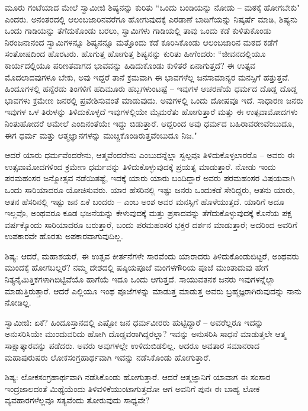 ಮೂರು ಗಂಟೆಯಾದ ಮೇಲೆ ಸ್ವಾಮೀಜಿ ಶಿಷ್ಯನನ್ನು ಕುರಿತು “ಒಂದು ಬಂಡಿಯನ್ನು ನೋಡು – ಮಠಕ್ಕೆ ಹೋಗಬೇಕು" ಎಂದರು. ಅನಂತರದಲ್ಲಿ ಆಲಂಬಜಾರಿನವರೆಗೂ ಹೋಗುವುದಕ್ಕೆ ಎರಡಾಣೆ ಬಾಡಿಗೆಯನ್ನು ನಿಷ್ಕರ್ಷೆ ಮಾಡಿ, ಶಿಷ್ಯನು ಒಂದು ಗಾಡಿಯನ್ನು ತೆಗೆದುಕೊಂಡು ಬರಲು, ಸ್ವಾಮಿಗಳು ಗಾಡಿಯಲ್ಲಿ ತಾವು ಒಂದು ಕಡೆ ಕುಳಿತುಕೊಂಡು ನಿರಂಜನಾನಂದ ಸ್ವಾಮಿಗಳನ್ನೂ ಶಿಷ್ಯನನ್ನೂ ಮತ್ತೊಂದು ಕಡೆ ಕೂರಿಸಿಕೊಂಡು ಆಲಂಬಜಾರಿನ ಮಠದ ಕಡೆಗೆ ಸಂತೋಷದಿಂದ ಹೊರಟರು. ಹೊಗುತ್ತ ಹೋಗುತ್ತ ಶಿಷ್ಯನನ್ನು ಕುರಿತು ಹೀಗೆಂದರು: “ಜೀವನದಲ್ಲಿಯೂ ಕಾರ್ಯದಲ್ಲಿಯೂ ಪರಿಣತವಾಗದ ಭಾವವನ್ನು ಹಿಡಿದುಕೊಂಡು ಕುಳಿತರೆ ಏನಾಗುತ್ತದೆ? ಈ ಉತ್ಸವ ಮೊದಲಾದವುಗಳೂ ಬೇಕು, ಅವು ಇದ್ದರೆ ತಾನೆ ಕ್ರಮವಾಗಿ ಈ ಭಾವಗಳೆಲ್ಲ ಜನಸಾಮಾನ್ಯರ ಮನಸ್ಸಿಗೆ ಹತ್ತುತ್ತವೆ. ಹಿಂದೂಗಳಲ್ಲಿ ಹನ್ನೆರಡು ತಿಂಗಳಿಗೆ ಹದಿಮೂರು ಹಬ್ಬಗಳುಂಟಷ್ಟೆ – ಇವುಗಳ ಆಚರಣೆಯೆ ಧರ್ಮದ ದೊಡ್ಡ ದೊಡ್ಡ ಭಾವಗಳು ಕ್ರಮೇಣ ಜನರಲ್ಲಿ ಪ್ರವೇಶಿಸುವಂತೆ ಮಾಡುವುದು. ಅವುಗಳಲ್ಲಿ ಒಂದು ದೋಷವೂ ಇದೆ. ಸಾಧಾರಣ ಜನರು ಇವುಗಳ ಒಳ ತಿರುಳನ್ನು ತಿಳಿದುಕೊಳ್ಳದೆ ಇವುಗಳಲ್ಲಿಯೇ ಮೈಮರೆತು ಹೋಗುತ್ತಾರೆ ಮತ್ತು ಈ ಉತ್ಸವಾಮೋದಗಳು ನಿಂತುಹೋದರೆ ಆಮೇಲೆ ಎಂದಿನಂತೆಯೇ ಇದ್ದು ಬಿಡುತ್ತಾರೆ. ಆದ್ದರಿಂದ ಅವು ಧರ್ಮದ ಬಹಿರಾವರಣವೆಂಬುದೂ, ಈಗ ಧರ್ಮ ಮತ್ತು ಆತ್ಮಜ್ಞಾನಗಳನ್ನು ಮುಚ್ಚಿಕೊಂಡಿರುತ್ತವೆಂಬುದೂ ನಿಜ."

ಆದರೆ ಯಾರು ಧರ್ಮವೆಂದರೇನು, ಆತ್ಮವೆಂದರೇನು ಎಂಬುದನ್ನೆಲ್ಲಾ ಸ್ವಲ್ಪವೂ ತಿಳಿದುಕೊಳ್ಳಲಾರರೊ – ಅವರು ಈ ಉತ್ಸವಾಮೋದಗಳಿಂದ ಕ್ರಮೇಣ ಧರ್ಮವನ್ನು ತಿಳಿದುಕೊಳ್ಳುವುದಕ್ಕೆ ಪ್ರಯತ್ನ ಮಾಡುತ್ತಾರೆ. ನೋಡು ಇಂದು ಪರಮಹಂಸರ ಜನ್ಮೋತ್ಸವ ನಡೆಯಿತಷ್ಟೆ, ಇದಕ್ಕೆ ಯಾರು ಯಾರು ಬಂದಿದ್ದಾರೆ ಅವರು ಪರಮಹಂಸರ ವಿಷಯವಾಗಿ ಒಂದು ಸಾರಿಯಾದರೂ ಯೋಚಿಸುವರು. ಯಾರ ಹೆಸರಿನಲ್ಲಿ ಇಷ್ಟು ಜನರು ಒಂದುಕಡೆ ಸೇರಿದ್ದರು, ಆತನು ಯಾರು, ಆತನ ಹೆಸರಿನಲ್ಲಿ ಇಷ್ಟು ಜನ ಏಕೆ ಬಂದರು – ಎಂಬ ಅಂಶ ಅವರ ಮನಸ್ಸಿಗೆ ಹೊಳೆಯುತ್ತದೆ. ಯಾರಿಗೆ ಅದೂ ಇಲ್ಲವೊ, ಅಂಥವರೂ ಕೂಡ ಭಜನೆಯನ್ನು ಕೇಳುವುದಕ್ಕೆ ಮತ್ತು ಪ್ರಸಾದವನ್ನು ತೆಗೆದುಕೊಳ್ಳುವುದಕ್ಕೆ ಕೊನೆಯ ಪಕ್ಷ ವರ್ಷಕ್ಕೊಂದು ಸಾರಿಯಾದರೂ ಬರುತ್ತಾರೆ, ಬಂದು ಪರಮಹಂಸರ ಭಕ್ತರ ದರ್ಶನ ಮಾಡುತ್ತಾರೆ; ಅದರಿಂದ ಅವರಿಗೆ ಉಪಕಾರವೇ ಹೊರತು ಅಪಕಾರವಾಗುವುದಿಲ್ಲ.

ಶಿಷ್ಯ: ಆದರೆ, ಮಹಾಶಯರೆ, ಈ ಉತ್ಸವ ಕೀರ್ತನೆಗಳೇ ಸಾರವೆಂದು ಯಾರಾದರು ತಿಳಿದುಕೊಂಡುಬಿಟ್ಟರೆ, ಅಂಥವರು ಮುಂದಕ್ಕೆ ಹೋಗಬಲ್ಲರೆ? ನಮ್ಮ ದೇಶದಲ್ಲಿ ಷಷ್ಠಿಯಪೂಜೆ ಮಂಗಳಗೌರಿಯ ಪೂಜೆ ಮುಂತಾದುವು ಹೇಗೆ ನಿತ್ಯನೈಮಿತ್ತಿಕಗಳಾಗಿಬಿಟ್ಟಿವೆಯೊ ಹಾಗೆಯೆ ಇದೂ ಒಂದು ಆಗುತ್ತದೆ. ಸಾಯುವತನಕ ಜನರು ಇವುಗಳನ್ನೆಲ್ಲಾ ಮಾಡುತ್ತಿರುತ್ತಾರೆ. ಆದರೆ ಎಲ್ಲಿಯೂ ಇಂಥ ಪೂಜೆಗಳನ್ನು ಮಾಡುತ್ತ ಮಾಡುತ್ತ ಅವರು ಬ್ರಹ್ಮಜ್ಞರಾಗಿರುವುದನ್ನು ನಾನು ನೋಡಿಲ್ಲ.

ಸ್ವಾಮೀಜಿ: ಏಕೆ? ಹಿಂದೂಸ್ತಾನದಲ್ಲಿ ಎಷ್ಟೋ ಜನ ಧರ್ಮವೀರರು ಹುಟ್ಟಿದ್ದಾರೆ – ಅವರೆಲ್ಲರೂ ಇದನ್ನು ಅನುಸರಿಸಿಯೇ ಮುಂದುವರಿದು ಹೋಗಿ ದೊಡ್ಡವರಾಗಿದ್ದರಲ್ಲಾ? ಇವನ್ನು ಅನುಸರಿಸಿ ಸಾಧನೆ ಮಾಡುತ್ತಲೇ ಆತ್ಮ ಸಾಕ್ಷಾತ್ಕಾರವನ್ನು ಪಡೆದರು. ಅವರು ಅವುಗಳಲ್ಲೇ ಉಳಿದುಬಿಡಲಿಲ್ಲ. ಆದರೂ ಅವತಾರ ಸಮಾನರಾದ ಮಹಾಪುರುಷರು ಲೋಕಸಂಗ್ರಹಾರ್ಥವಾಗಿ ಇವನ್ನು ನಡೆಸಿಕೊಂಡು ಹೋಗುತ್ತಾರೆ.

ಶಿಷ್ಯ: ಲೋಕಸಂಗ್ರಹಾರ್ಥವಾಗಿ ನಡೆಸಿಕೊಂಡು ಹೋಗುತ್ತಾರೆ. ಆದರೆ ಆತ್ಮಜ್ಞಾನಿಗೆ ಯಾವಾಗ ಈ ಸಂಸಾರ ಇಂದ್ರಜಾಲದಂತೆ ಮಿಥ್ಯೆಯೆಂದು ತಿಳಿವಳಿಕೆಯುಂಟಾಗುತ್ತದೋ ಆಗ ಅವನಿಗೆ ಪುನಃ ಈ ಬಾಹ್ಯ ಲೋಕ ವ್ಯವಹಾರಗಳೆಲ್ಲವೂ ಸತ್ಯವೆಂದು ತೋರುವುದು ಸಾಧ್ಯವೇ?


